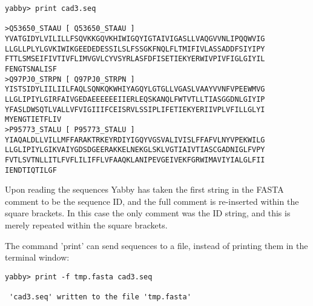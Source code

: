 \begin{verbatim}
yabby> print cad3.seq

>Q53650_STAAU [ Q53650_STAAU ]
YVATGIDYLVILILLFSQVKKGQVKHIWIGQYIGTAIVIGASLLVAQGVVNLIPQQWVIG
LLGLLPLYLGVKIWIKGEEDEDESSILSLFSSGKFNQLFLTMIFIVLASSADDFSIYIPY
FTTLSMSEIFIVTIVFLIMVGVLCYVSYRLASFDFISETIEKYERWIVPIVFIGLGIYIL
FENGTSNALISF
>Q97PJ0_STRPN [ Q97PJ0_STRPN ]
YISTSIDYLIILIILFAQLSQNKQKWHIYAGQYLGTGLLVGASLVAAYVVNFVPEEWMVG
LLGLIPIYLGIRFAIVGEDAEEEEEEIIERLEQSKANQLFWTVTLLTIASGGDNLGIYIP
YFASLDWSQTLVALLVFVIGIIIFCEISRVLSSIPLIFETIEKYERIIVPLVFILLGLYI
MYENGTIETFLIV
>P95773_STALU [ P95773_STALU ]
YIAQALDLLVILLMFFARAKTRKEYRDIYIGQYVGSVALIVISLFFAFVLNYVPEKWILG
LLGLIPIYLGIKVAIYGDSDGEERAKKELNEKGLSKLVGTIAIVTIASCGADNIGLFVPY
FVTLSVTNLLITLFVFLILIFFLVFAAQKLANIPEVGEIVEKFGRWIMAVIYIALGLFII
IENDTIQTILGF
\end{verbatim}

Upon reading the sequences Yabby has taken the first string
in the FASTA comment to be the sequence ID, and the full
comment is re-inserted within the square brackets. In this
case the only comment was the ID string, and this is merely
repeated within the square brackets. 

The command 'print' can send sequences to a file, instead
of printing them in the terminal window:

\begin{verbatim}
yabby> print -f tmp.fasta cad3.seq

 'cad3.seq' written to the file 'tmp.fasta'

\end{verbatim}


